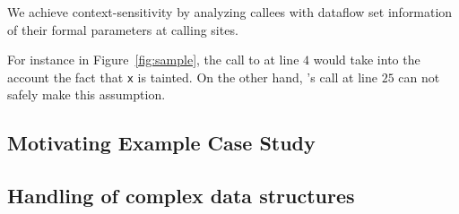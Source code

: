 We achieve context-sensitivity by analyzing callees
with dataflow set information of their formal parameters
at calling sites.

For instance in Figure~\ref{fig:sample}, the call to \even{} at
line $4$ would take into the account the fact that \texttt{x}
is tainted.
On the other hand, \even{}'s call at line $25$ can not safely
make this assumption.

\subsection{Motivating Example Case Study}\label{sec:sampleSummary}

\subsection{Handling of complex data structures}
